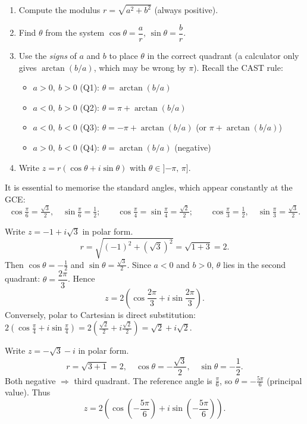 \documentclass[11pt]{article}
\begin{document}
\begin{methode}
\begin{enumerate}
\item Compute the modulus $r = \sqrt{a^{2}+b^{2}}$ (always positive).
\item Find $\theta$ from the system $\cos\theta = \dfrac{a}{r}$, $\sin\theta = \dfrac{b}{r}$.
\item Use the \emph{signs} of $a$ and $b$ to place $\theta$ in the correct quadrant (a calculator only gives $\arctan(b/a)$, which may be wrong by $\pi$). Recall the CAST rule:
  \begin{itemize}
  \item $a>0,\ b>0$ (Q1): $\theta = \arctan(b/a)$
  \item $a<0,\ b>0$ (Q2): $\theta = \pi + \arctan(b/a)$
  \item $a<0,\ b<0$ (Q3): $\theta = -\pi + \arctan(b/a)$ (or $\pi + \arctan(b/a)$)
  \item $a>0,\ b<0$ (Q4): $\theta = \arctan(b/a)$ (negative)
  \end{itemize}
\item Write $z = r(\cos\theta + i\sin\theta)$ with $\theta \in {]{-\pi},\,\pi]}$.
\end{enumerate}
\end{methode}

It is essential to memorise the standard angles, which appear constantly at the GCE:
\[
\cos\tfrac{\pi}{6}=\tfrac{\sqrt3}{2},\quad \sin\tfrac{\pi}{6}=\tfrac12;\qquad
\cos\tfrac{\pi}{4}=\sin\tfrac{\pi}{4}=\tfrac{\sqrt2}{2};\qquad
\cos\tfrac{\pi}{3}=\tfrac12,\quad \sin\tfrac{\pi}{3}=\tfrac{\sqrt3}{2}.
\]

\begin{exemplebox}
Write $z = -1 + i\sqrt{3}$ in polar form.
\[
r = \sqrt{(-1)^{2}+(\sqrt3)^{2}} = \sqrt{1+3} = 2.
\]
Then $\cos\theta = -\tfrac12$ and $\sin\theta = \tfrac{\sqrt3}{2}$. Since $a<0$ and $b>0$, $\theta$ lies in the second quadrant: $\theta = \dfrac{2\pi}{3}$. Hence
\[
z = 2\left(\cos\frac{2\pi}{3} + i\sin\frac{2\pi}{3}\right).
\]
Conversely, polar to Cartesian is direct substitution: $2\left(\cos\frac{\pi}{4}+i\sin\frac{\pi}{4}\right) = 2\left(\frac{\sqrt2}{2}+i\frac{\sqrt2}{2}\right) = \sqrt2 + i\sqrt2$.
\end{exemplebox}

\begin{exemplebox}
Write $z = -\sqrt{3} - i$ in polar form.
\[
r = \sqrt{3+1} = 2,\quad \cos\theta = -\frac{\sqrt3}{2},\quad \sin\theta = -\frac12.
\]
Both negative $\Rightarrow$ third quadrant. The reference angle is $\frac{\pi}{6}$, so $\theta = -\frac{5\pi}{6}$ (principal value). Thus
\[
z = 2\left(\cos\left(-\frac{5\pi}{6}\right) + i\sin\left(-\frac{5\pi}{6}\right)\right).
\]
\end{exemplebox}
\end{document}
